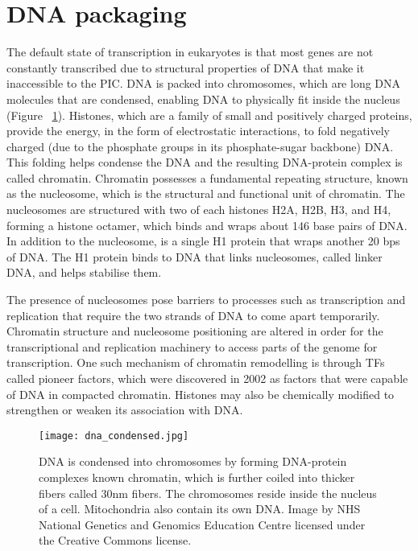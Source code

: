 \section{DNA packaging}

The default state of transcription in eukaryotes is that most genes are not constantly transcribed due to structural properties of DNA that make it inaccessible to the PIC. DNA is packed into chromosomes, which are long DNA molecules that are condensed, enabling DNA to physically fit inside the nucleus (Figure ~\ref{fig:dna_condensed}). Histones, which are a family of small and positively charged proteins, provide the energy, in the form of electrostatic interactions, to fold negatively charged (due to the phosphate groups in its phosphate-sugar backbone) DNA. This folding helps condense the DNA and the resulting DNA-protein complex is called chromatin. Chromatin possesses a fundamental repeating structure\cite{holde01111974}, known as the nucleosome, which is the structural and functional unit of chromatin. The nucleosomes are structured with two of each histones H2A, H2B, H3, and H4, forming a histone octamer, which binds and wraps about 146 base pairs of DNA. In addition to the nucleosome, is a single H1 protein that wraps another 20 bps of DNA. The H1 protein binds to DNA that links nucleosomes, called linker DNA, and helps stabilise them.

The presence of nucleosomes pose barriers to processes such as transcription and replication that require the two strands of DNA to come apart temporarily. Chromatin structure and nucleosome positioning are altered in order for the transcriptional and replication machinery to access parts of the genome for transcription. One such mechanism of chromatin remodelling is through TFs called pioneer factors, which were discovered in 2002 as factors that were capable of DNA in compacted chromatin\cite{pmid11864602}. Histones may also be chemically modified to strengthen or weaken its association with DNA.

\begin{figure}[!ht]
   \centering
   \texttt{[image: dna\_condensed.jpg]}
   \caption[Condensation of DNA]{DNA is condensed into chromosomes by forming DNA-protein complexes known chromatin, which is further coiled into thicker fibers called 30nm fibers. The chromosomes reside inside the nucleus of a cell. Mitochondria also contain its own DNA. Image by NHS National Genetics and Genomics Education Centre licensed under the Creative Commons license.}
   \label{fig:dna_condensed}
\end{figure}

